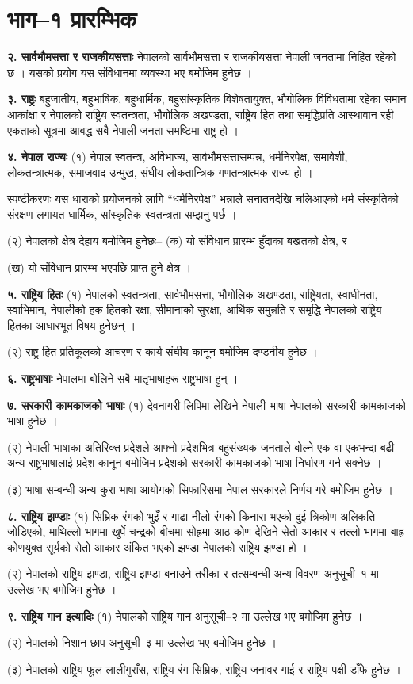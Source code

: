 \section{भाग–१ प्रारम्भिक}

\textbf{२. सार्वभौमसत्ता र राजकीयसत्ताः} नेपालको सार्वभौमसत्ता र राजकीयसत्ता नेपाली जनतामा निहित रहेको छ । यसको प्रयोग यस संविधानमा व्यवस्था भए बमोजिम हुनेछ ।

\textbf{३. राष्ट्रः} बहुजातीय, बहुभाषिक, बहुधार्मिक, बहुसांस्कृतिक विशेषतायुक्त, भौगोलिक विविधतामा रहेका समान आकांक्षा र नेपालको राष्ट्रिय स्वतन्त्रता, भौगोलिक अखण्डता, राष्ट्रिय हित तथा समृद्धिप्रति आस्थावान रही एकताको सूत्रमा आबद्ध सबै नेपाली जनता समष्टिमा राष्ट्र हो ।

\textbf{४. नेपाल राज्यः} (१) नेपाल स्वतन्त्र, अविभाज्य, सार्वभौमसत्तासम्पन्न, धर्मनिरपेक्ष, समावेशी, लोकतन्त्रात्मक, समाजवाद उन्मुख, संघीय लोकतान्त्रिक गणतन्त्रात्मक राज्य हो ।

स्पष्टीकरणः यस धाराको प्रयोजनको लागि “धर्मनिरपेक्ष” भन्नाले सनातनदेखि चलिआएको धर्म संस्कृतिको संरक्षण लगायत धार्मिक, सांस्कृतिक स्वतन्त्रता सम्झनु पर्छ ।

(२) नेपालको क्षेत्र देहाय बमोजिम हुनेछः– (क) यो संविधान प्रारम्भ हुँदाका बखतको क्षेत्र, र

(ख) यो संविधान प्रारम्भ भएपछि प्राप्त हुने क्षेत्र ।

\textbf{५. राष्ट्रिय हितः} (१) नेपालको स्वतन्त्रता, सार्वभौमसत्ता, भौगोलिक अखण्डता, राष्ट्रियता, स्वाधीनता, स्वाभिमान, नेपालीको हक हितको रक्षा, सीमानाको सुरक्षा, आर्थिक समुन्नति र समृद्धि नेपालको राष्ट्रिय हितका आधारभूत विषय हुनेछन् ।

(२) राष्ट्र हित प्रतिकूलको आचरण र कार्य संघीय कानून बमोजिम दण्डनीय हुनेछ ।

\textbf{६. राष्ट्रभाषाः} नेपालमा बोलिने सबै मातृभाषाहरू राष्ट्रभाषा हुन् ।

\textbf{७. सरकारी कामकाजको भाषाः} (१) देवनागरी लिपिमा लेखिने नेपाली भाषा नेपालको सरकारी कामकाजको भाषा हुनेछ ।

(२) नेपाली भाषाका अतिरिक्त प्रदेशले आफ्नो प्रदेशभित्र बहुसंख्यक जनताले बोल्ने एक वा एकभन्दा बढी अन्य राष्ट्रभाषालाई प्रदेश कानून
बमोजिम प्रदेशको सरकारी कामकाजको भाषा निर्धारण गर्न सक्नेछ ।

(३) भाषा सम्बन्धी अन्य कुरा भाषा आयोगको सिफारिसमा नेपाल सरकारले निर्णय गरे बमोजिम हुनेछ ।

\textbf{८. राष्ट्रिय झण्डाः} (१) सिम्रिक रंगको भुइँ र गाढा नीलो रंगको किनारा भएको दुई त्रिकोण अलिकति जोडिएको, माथिल्लो भागमा खुर्पे चन्द्रको बीचमा सोह्रमा आठ कोण देखिने सेतो आकार र तल्लो भागमा बाह्र कोणयुक्त सूर्यको सेतो आकार अंकित भएको झण्डा नेपालको राष्ट्रिय झण्डा हो ।

(२) नेपालको राष्ट्रिय झण्डा, राष्ट्रिय झण्डा बनाउने तरीका र तत्सम्बन्धी अन्य विवरण अनुसूची–१ मा उल्लेख भए बमोजिम हुनेछ ।

\textbf{९. राष्ट्रिय गान इत्यादिः} (१) नेपालको राष्ट्रिय गान अनुसूची–२ मा उल्लेख भए बमोजिम हुनेछ ।

(२) नेपालको निशान छाप अनुसूची–३ मा उल्लेख भए बमोजिम हुनेछ ।

(३) नेपालको राष्ट्रिय फूल लालीगुराँस, राष्ट्रिय रंग सिम्रिक, राष्ट्रिय जनावर गाई र राष्ट्रिय पक्षी डाँफे हुनेछ ।